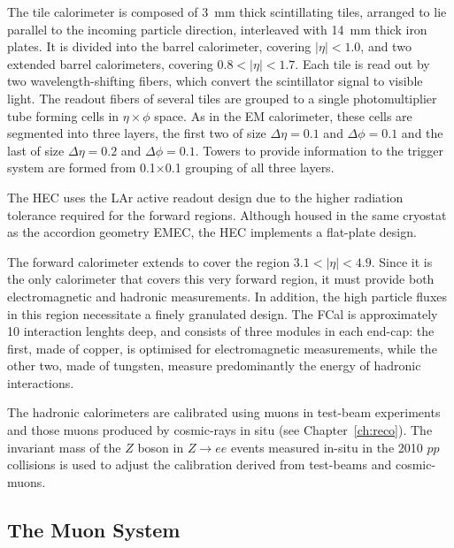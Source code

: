 The tile calorimeter is composed of 3~mm thick scintillating tiles, arranged to lie parallel  to the incoming particle direction, interleaved with 14~mm thick iron plates. %
It is divided into the barrel calorimeter, covering $|\eta|<1.0$, and two extended barrel calorimeters, covering  $0.8 < |\eta| <1.7$. Each tile is read out by two wavelength-shifting fibers, which convert the scintillator signal to visible light. The readout fibers of several tiles are grouped to a single photomultiplier tube forming cells in $\eta \times \phi$ space. As in the EM calorimeter, these cells are segmented into three layers, the first two of size $\Delta \eta = 0.1$ and  $\Delta \phi = 0.1$ and the last of size   $\Delta \eta = 0.2$ and  $\Delta \phi = 0.1$.  Towers to provide information to the trigger system are formed from 0.1$\times$0.1 grouping of all three layers.

The HEC uses the LAr active readout design due to the higher radiation tolerance required for the forward regions.  Although housed in the same cryostat as the accordion geometry EMEC, the HEC implements a flat-plate design.

The forward calorimeter extends to cover the region $3.1<|\eta|<4.9$. Since it is the only calorimeter that covers this very forward region, it must provide both electromagnetic and hadronic measurements. In addition, the high particle fluxes in this region necessitate a finely granulated design. The FCal is approximately 10 interaction lenghts deep, and consists of three modules in each end-cap: the first, made of copper, is optimised for electromagnetic measurements, while the other two, made of tungsten, measure predominantly the energy of hadronic interactions.

The hadronic calorimeters are calibrated using muons in test-beam experiments %
and those muons produced by cosmic-rays in situ (see Chapter~\ref{ch:reco}). %
The invariant mass of the $Z$ boson in $Z \rightarrow ee$ events measured in-situ in the 2010 $pp$ collisions is used to adjust the calibration derived from test-beams and cosmic-muons.





\subsection{The Muon System}\label{sec:Muon}
 
